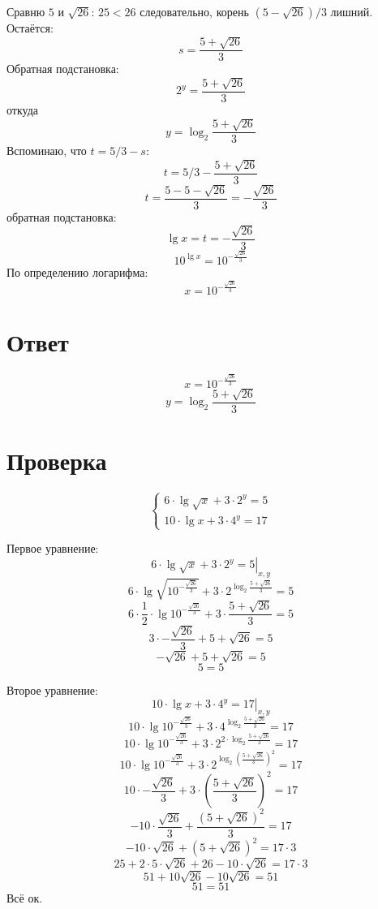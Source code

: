 \documentclass{article}
\begin{document}
Сравню $5$ и $\sqrt{26}$: $25<26$ следовательно, корень $(5-\sqrt{26})/3$ лишний. Остаётся:
$$s=\frac{5+\sqrt{26}}{3}$$
Обратная подстановка:
$$2^y=\frac{5+\sqrt{26}}{3}$$
откуда
$$y=\log_{2}{\frac{5+\sqrt{26}}{3}}$$
Вспоминаю, что $t=5/3-s$:
$$t=5/3-\frac{5+\sqrt{26}}{3}$$
$$t=\frac{5-5-\sqrt{26}}{3}=-\frac{\sqrt{26}}{3}$$
обратная подстановка:
$$\lg{x}=t=-\frac{\sqrt{26}}{3}$$
$$10^{\lg{x}}=10^{ -\frac{\sqrt{26}}{3} }$$
По определению логарифма:
$$x=10^{-\frac{\sqrt{26}}{3} }$$

\section{Ответ}
$$x=10^{-\frac{\sqrt{26}}{3} }$$
$$y=\log_{2}{\frac{5+\sqrt{26}}{3}}$$

\section{Проверка}
\begin{equation*}
    \begin{cases} 
    6\cdot\lg{\sqrt{x}}+3\cdot{}2^y=5 \\ 10\cdot\lg{x}+3\cdot{}4^y=17
    \end{cases}
\end{equation*}

Первое уравнение:
$$\left.6\cdot\lg{\sqrt{x}}+3\cdot{}2^y=5\right|_{x,y}$$
$$6\cdot\lg{\sqrt{10^{-\frac{\sqrt{26}}{3} }}}+3\cdot{}2^{ \log_{2}{\frac{5+\sqrt{26}}{3}} }=5$$
$$6\cdot{}\frac{1}{2}\cdot\lg{10^{-\frac{\sqrt{26}}{3} }}+3\cdot{}\frac{5+\sqrt{26}}{3}=5$$
$$3\cdot-\frac{\sqrt{26}}{3}+5+\sqrt{26}=5$$
$$-\sqrt{26}+5+\sqrt{26}=5$$
$$5=5$$

Второе уравнение:
$$\left.10\cdot\lg{x}+3\cdot{}4^y=17\right|_{x,y}$$
$$10\cdot\lg{ 10^{-\frac{\sqrt{26}}{3} } }+3\cdot{}4^{ \log_{2}{\frac{5+\sqrt{26}}{3}} }=17$$
$$10\cdot\lg{ 10^{-\frac{\sqrt{26}}{3} } }+3\cdot{}2^{ 2\cdot\log_{2}{\frac{5+\sqrt{26}}{3}} }=17$$
$$10\cdot\lg{ 10^{-\frac{\sqrt{26}}{3} } }+3\cdot{}2^{ \log_{2}{\left(\frac{5+\sqrt{26}}{3}\right)^2} }=17$$
$$10\cdot-\frac{\sqrt{26}}{3} + 3\cdot{}\left(\frac{5+\sqrt{26}}{3}\right)^2 = 17$$
$$-10\cdot\frac{\sqrt{26}}{3} + \frac{(5+\sqrt{26})^2}{3} = 17$$
$$-10\cdot\sqrt{26} + (5+\sqrt{26})^2 = 17\cdot{3}$$
$$25+2\cdot{}5\cdot{}\sqrt{26}+26-10\cdot\sqrt{26} = 17\cdot{3}$$
$$51+10\sqrt{26}-10\sqrt{26} = 51$$
$$51 = 51$$
Всё ок.
\end{document}
